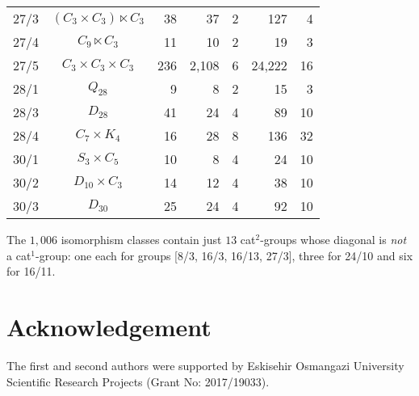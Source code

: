 \documentclass[a4paper,11pt]{article}
\theoremstyle{plain}
\theoremstyle{definition}
\begin{document}
\begin{longtable}{ccrrrrr}
	27/3 & $(C_3 \times C_3) \ltimes C_3$ & 38 & 37 & 2 & 127 & 4 \\ 
	27/4 & $C_9 \ltimes C_3$ & 11 & 10 & 2 & 19 & 3 \\ 
	27/5 & $C_3 \times C_3 \times C_3$ & 236 & 2,108 & 6 & 24,222  & 16 \\ 
	28/1 & $Q_{28}$ & 9 & 8 & 2 & 15 & 3 \\ 
	28/3 & $D_{28}$ & 41 & 24 & 4 & 89 & 10 \\ 
	28/4 & $C_7 \times K_4$ & 16 & 28 & 8 & 136 & 32 \\ 
	30/1 & $S_3 \times C_5$ & 10 & 8 & 4 & 24 & 10 \\ 
	30/2 & $D_{10} \times C_3$ & 14 & 12 & 4 & 38 & 10 \\ 
	30/3 & $D_{30}$ & 25 & 24 & 4 & 92 & 10 \\ 
	\hline
\end{longtable}
The $1,006$ isomorphism classes contain just $13$ cat$^2$-groups 
whose diagonal is \emph{not} a cat$^1$-group: 
one each for groups [8/3, 16/3, 16/13, 27/3], 
three for 24/10 and six for 16/11. 

\section*{Acknowledgement}

The first and second authors were supported by Eskisehir Osmangazi
University Scientific Research Projects (Grant No: 2017/19033).
\end{document}
